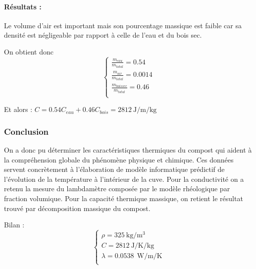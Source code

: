 \documentclass[../PS6_RapportFinal.tex]{subfiles}
\begin{document}
\paragraph{Résultats :}
Le volume d’air est important mais son pourcentage massique est faible car sa densité est négligeable par rapport à celle de l’eau et du bois sec.


On obtient donc
\[
  		\left\{
          \begin{array}{ll}
            \frac{m_{eau}}{m_{total}} = \num{0.54} \\
            \frac{m_{air}}{m_{total}} =  \num{0.0014} \\
            \frac{m_{bois sec}}{m_{total}} =  \num{0.46} \\
          \end{array}
        \right.
\]

Et alors :   $C=\num{0.54}C_{eau}+\num{0.46}C_{bois}=2812 \: \si{\joule\per\metre\per\kilogram}$

\subsubsection{Conclusion}


On a donc pu déterminer les caractéristiques thermiques du compost qui aident à la compréhension globale du phénomène physique et chimique. Ces données servent concrètement à l'élaboration de modèle informatique prédictif de l'évolution de la température à l'intérieur de la cuve.
Pour la conductivité on a retenu la mesure du lambdamètre composée par le modèle rhéologique par fraction volumique.
Pour la capacité thermique massique, on retient le résultat trouvé par décomposition massique du compost.

Bilan   :   
\[
  		\left\{
          \begin{array}{ll}
            \rho = 325 \: \si{\kilogram\per\cubic\metre}\\
            C =  2812 \: \si{\joule\per\kelvin\per\kilogram}\\
            \lambda = 0.0538 \: \: \si{\watt\per\metre\per\kelvin}\\
          \end{array}
        \right.
\]
                       
\end{document}
